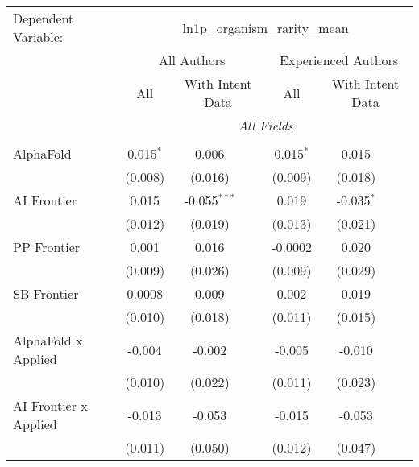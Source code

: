 \begingroup
\centering
\begin{tabular}{lcccccc}
   \tabularnewline \midrule \midrule
   Dependent Variable: & \multicolumn{6}{c}{ln1p\_organism\_rarity\_mean}\\
 & \multicolumn{3}{c}{All Authors} & \multicolumn{3}{c}{Experienced Authors} \\
\cmidrule(lr){2-4} \cmidrule(lr){5-7}
 & \multicolumn{1}{c}{All} & \multicolumn{2}{c}{With Intent Data} & \multicolumn{1}{c}{All} & \multicolumn{2}{c}{With Intent Data} \\
\cmidrule(lr){2-2} \cmidrule(lr){3-4} \cmidrule(lr){5-5} \cmidrule(lr){6-7}
 & \multicolumn{6}{c}{\textit{All Fields}} \\ \\
   AlphaFold                      & 0.015$^{*}$ & 0.006          &              & 0.015$^{*}$ & 0.015        &   \\   
                                  & (0.008)     & (0.016)        &              & (0.009)     & (0.018)      &   \\   
   AI Frontier                    & 0.015       & -0.055$^{***}$ &              & 0.019       & -0.035$^{*}$ &   \\   
                                  & (0.012)     & (0.019)        &              & (0.013)     & (0.021)      &   \\   
   PP Frontier                    & 0.001       & 0.016          &              & -0.0002     & 0.020        &   \\   
                                  & (0.009)     & (0.026)        &              & (0.009)     & (0.029)      &   \\   
   SB Frontier                    & 0.0008      & 0.009          &              & 0.002       & 0.019        &   \\   
                                  & (0.010)     & (0.018)        &              & (0.011)     & (0.015)      &   \\   
   AlphaFold x Applied            & -0.004      & -0.002         &              & -0.005      & -0.010       &   \\   
                                  & (0.010)     & (0.022)        &              & (0.011)     & (0.023)      &   \\   
   AI Frontier x Applied          & -0.013      & -0.053         &              & -0.015      & -0.053       &   \\   
                                  & (0.011)     & (0.050)        &              & (0.012)     & (0.047)      &   \\   

\end{tabular}
